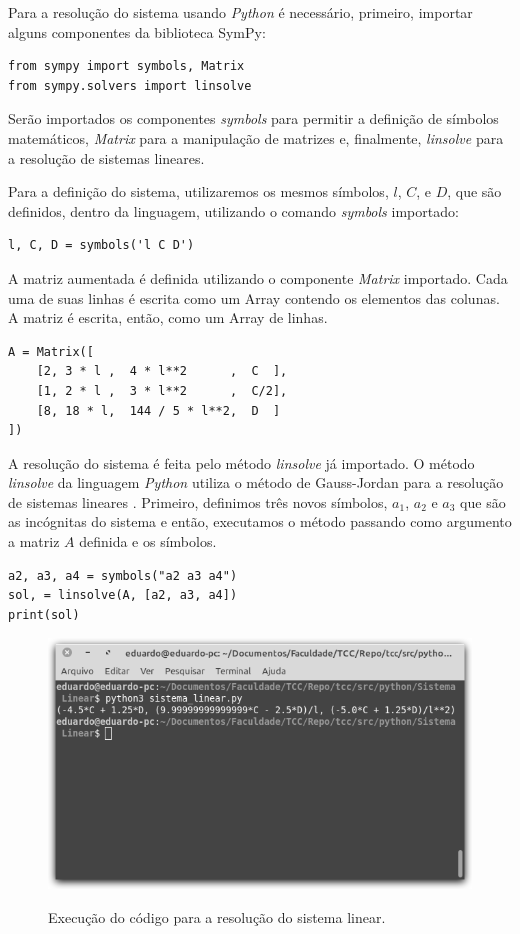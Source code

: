 \documentclass[
	12pt,				%
	openright,			%
    twoside,			%
	a4paper,			%
	chapter=TITLE,		%
	english,			%
	french,				%
	spanish,			%
	brazil				%
	]{abntex2}
\numberwithin{lema}{chapter}
\numberwithin{teorema}{chapter}
\numberwithin{definicao}{chapter}
\numberwithin{exemplo}{chapter}
\numberwithin{figure}{chapter}
\begin{document}
\begin{apendicesenv}
{	Para a resolução do sistema usando \textit{Python} é necessário, primeiro, importar alguns componentes da biblioteca SymPy:
	\begin{lstlisting}[style=Python]
from sympy import symbols, Matrix
from sympy.solvers import linsolve
	\end{lstlisting}
	
	Serão importados os componentes \textit{symbols} para permitir a definição de símbolos matemáticos, \textit{Matrix} para a manipulação de matrizes e, finalmente, \textit{linsolve} para a resolução de sistemas lineares.
	
	Para a definição do sistema, utilizaremos os mesmos símbolos, $l$, $C$, e $D$, que são definidos, dentro da linguagem, utilizando o comando \textit{symbols} importado:
	\begin{lstlisting}[style=Python]
l, C, D = symbols('l C D')
	\end{lstlisting}
	
	A matriz aumentada é definida utilizando o componente \textit{Matrix} importado. Cada uma de suas linhas é escrita como um Array contendo os elementos das colunas. A matriz é escrita, então, como um Array de linhas.
	\begin{lstlisting}[style=Python]
A = Matrix([
    [2, 3 * l ,  4 * l**2      ,  C  ],
    [1, 2 * l ,  3 * l**2      ,  C/2],
    [8, 18 * l,  144 / 5 * l**2,  D  ]
])
	\end{lstlisting}
	
	A resolução do sistema é feita pelo método \textit{linsolve} já importado. O método \textit{linsolve} da linguagem \textit{Python} utiliza o método de Gauss-Jordan para a resolução de sistemas lineares \cite{SymPy}. Primeiro, definimos três novos símbolos, $a_1$, $a_2$ e $a_3$ que são as incógnitas do sistema e então, executamos o método passando como argumento a matriz $A$ definida e os símbolos.
	\begin{lstlisting}[style=Python]
a2, a3, a4 = symbols("a2 a3 a4")
sol, = linsolve(A, [a2, a3, a4])
print(sol)
	\end{lstlisting}

	\begin{figure}[h]
		\caption{Execução do código para a resolução do sistema linear.}
		\centering
		\includegraphics[scale=2]{../figuras/code/code_solve_sis_linear.png}
		\label{fig:code_solve_sis_linear}
	\end{figure}
	
}
\end{apendicesenv}
\end{document}
